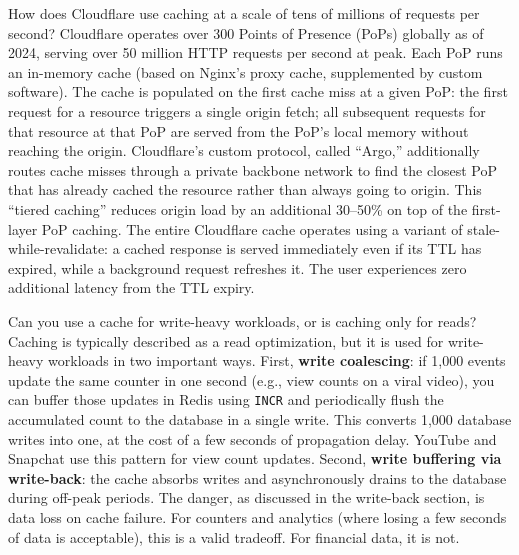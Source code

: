 \documentclass[11pt,a4paper]{article}
\begin{document}
\vspace{6pt}

\begin{curiobox}{How does Cloudflare use caching at a scale of tens of millions of requests per second?}
Cloudflare operates over 300 Points of Presence (PoPs) globally as of 2024, serving over 50 million HTTP requests per second at peak. Each PoP runs an in-memory cache (based on Nginx's proxy cache, supplemented by custom software). The cache is populated on the first cache miss at a given PoP: the first request for a resource triggers a single origin fetch; all subsequent requests for that resource at that PoP are served from the PoP's local memory without reaching the origin. Cloudflare's custom protocol, called ``Argo,'' additionally routes cache misses through a private backbone network to find the closest PoP that has already cached the resource rather than always going to origin. This ``tiered caching'' reduces origin load by an additional 30--50\% on top of the first-layer PoP caching. The entire Cloudflare cache operates using a variant of stale-while-revalidate: a cached response is served immediately even if its TTL has expired, while a background request refreshes it. The user experiences zero additional latency from the TTL expiry.
\end{curiobox}

\vspace{6pt}

\begin{curiobox}{Can you use a cache for write-heavy workloads, or is caching only for reads?}
Caching is typically described as a read optimization, but it is used for write-heavy workloads in two important ways. First, \textbf{write coalescing}: if 1,000 events update the same counter in one second (e.g., view counts on a viral video), you can buffer those updates in Redis using \texttt{INCR} and periodically flush the accumulated count to the database in a single write. This converts 1,000 database writes into one, at the cost of a few seconds of propagation delay. YouTube and Snapchat use this pattern for view count updates. Second, \textbf{write buffering via write-back}: the cache absorbs writes and asynchronously drains to the database during off-peak periods. The danger, as discussed in the write-back section, is data loss on cache failure. For counters and analytics (where losing a few seconds of data is acceptable), this is a valid tradeoff. For financial data, it is not.
\end{curiobox}
\end{document}
